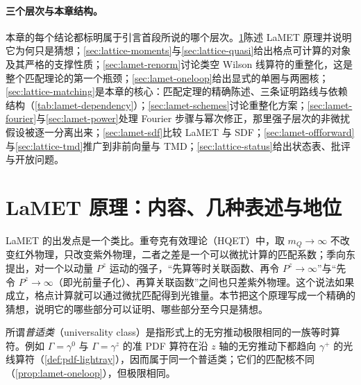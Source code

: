 \paragraph{三个层次与本章结构。}
本章的每个结论都标明属于引言首段所说的哪个层次。\cref{sec:lamet-principle}陈述 LaMET 原理并说明它为何只是猜想；\cref{sec:lattice-moments}与\cref{sec:lattice-quasi}给出格点可计算的对象及其严格的支撑性质；\cref{sec:lamet-renorm}讨论类空 Wilson 线算符的重整化，这是整个匹配理论的第一个瓶颈；\cref{sec:lamet-oneloop}给出显式的单圈与两圈核；\cref{sec:lattice-matching}是本章的核心：匹配定理的精确陈述、三条证明路线与依赖结构（\cref{tab:lamet-dependency}）；\cref{sec:lamet-schemes}讨论重整化方案；\cref{sec:lamet-fourier}与\cref{sec:lamet-power}处理 Fourier 步骤与幂次修正，那里强子层次的非微扰假设被逐一分离出来；\cref{sec:lamet-sdf}比较 LaMET 与 SDF；\cref{sec:lamet-offforward}与\cref{sec:lattice-tmd}推广到非前向量与 TMD；\cref{sec:lattice-status}给出状态表、批评与开放问题。

\section{LaMET 原理：内容、几种表述与地位}\label{sec:lamet-principle}

LaMET 的出发点是一个类比。重夸克有效理论（HQET）中，取 $m_Q\to\infty$ 不改变红外物理，只改变紫外物理，二者之差是一个可以微扰计算的匹配系数；季向东提出，对一个以动量 $P^z$ 运动的强子，“先算等时关联函数、再令 $P^z\to\infty$”与“先令 $P^z\to\infty$（即光前量子化）、再算关联函数”之间也只差紫外物理\cite{Ji2013,Ji:2014gla}。这个说法如果成立，格点计算就可以通过微扰匹配得到光锥量。本节把这个原理写成一个精确的猜想，说明它的哪些部分可以证明、哪些部分至今只是猜想。

所谓\emph{普适类}（universality class）是指形式上的无穷推动极限相同的一族等时算符\cite{Ji:2014gla,Hatta:2013gta}。例如 $\Gamma=\gamma^0$ 与 $\Gamma=\gamma^z$ 的准 PDF 算符在沿 $z$ 轴的无穷推动下都趋向 $\gamma^+$ 的光线算符（\cref{def:pdf-lightray}），因而属于同一个普适类；它们的匹配核不同（\cref{prop:lamet-oneloop}），但极限相同。


